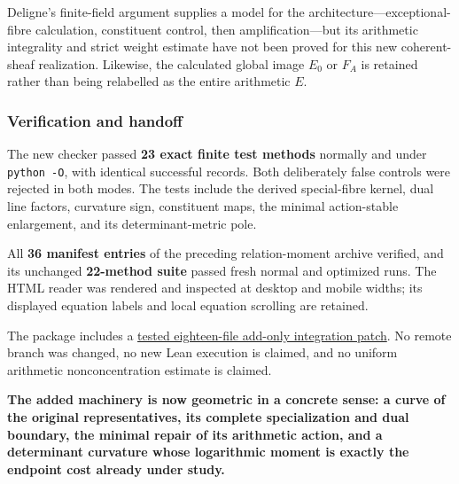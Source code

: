 Deligne's finite-field argument supplies a model for the architecture---exceptional-fibre calculation, constituent control, then amplification---but its arithmetic integrality and strict weight estimate have not been proved for this new coherent-sheaf realization. Likewise, the calculated global image \(E_0\) or \(F_A\) is retained rather than being relabelled as the entire arithmetic \(E\).

\subsubsection{Verification and handoff}\label{endpoint-curvature_original--verification-and-handoff}

The new checker passed \textbf{23 exact finite test methods} normally and under \texttt{python\ -O}, with identical successful records. Both deliberately false controls were rejected in both modes. The tests include the derived special-fibre kernel, dual line factors, curvature sign, constituent maps, the minimal action-stable enlargement, and its determinant-metric pole.

All \textbf{36 manifest entries} of the preceding relation-moment archive verified, and its unchanged \textbf{22-method suite} passed fresh normal and optimized runs. The HTML reader was rendered and inspected at desktop and mobile widths; its displayed equation labels and local equation scrolling are retained.

The package includes a \href{sources/endpoint_user_sources/HISTORICAL_DOWNLOAD_LINKS.md}{tested eighteen-file add-only integration patch}. No remote branch was changed, no new Lean execution is claimed, and no uniform arithmetic nonconcentration estimate is claimed.

\textbf{The added machinery is now geometric in a concrete sense: a curve of the original representatives, its complete specialization and dual boundary, the minimal repair of its arithmetic action, and a determinant curvature whose logarithmic moment is exactly the endpoint cost already under study.}

